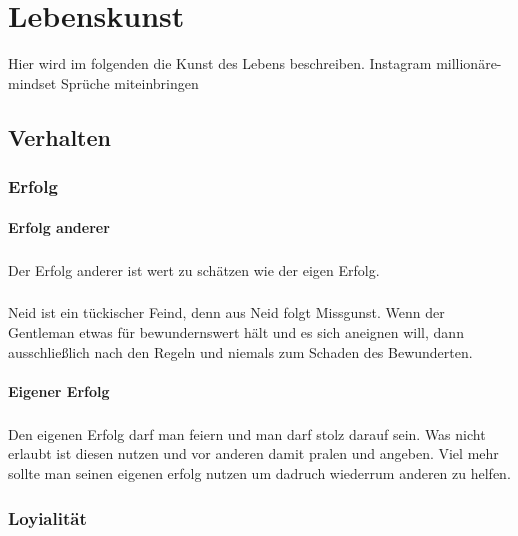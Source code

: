 \chapter{Lebenskunst} 
    \begin{thesis_quotation}

    \end{thesis_quotation}
    
    Hier wird im folgenden die Kunst des Lebens beschreiben. 
    {\color{red}Instagram millionäre-mindset Sprüche miteinbringen }
    
    \section{Verhalten}
        \subsection{Erfolg}
            \subsubsection{Erfolg anderer}
                \paragraph{} Der Erfolg anderer ist wert zu schätzen wie der eigen Erfolg.
                \paragraph{} Neid ist ein tückischer Feind, denn aus Neid folgt Missgunst. Wenn der Gentleman etwas für bewundernswert hält und es sich aneignen will, dann ausschließlich
                nach den Regeln und niemals zum Schaden des Bewunderten.
            \subsubsection{Eigener Erfolg}
                \paragraph{} Den eigenen Erfolg darf man feiern und man darf stolz darauf sein. Was nicht erlaubt ist diesen nutzen und vor anderen damit pralen und angeben. Viel mehr sollte man seinen eigenen erfolg nutzen um dadruch wiederrum anderen zu helfen.
        \subsection{Loyialität}
